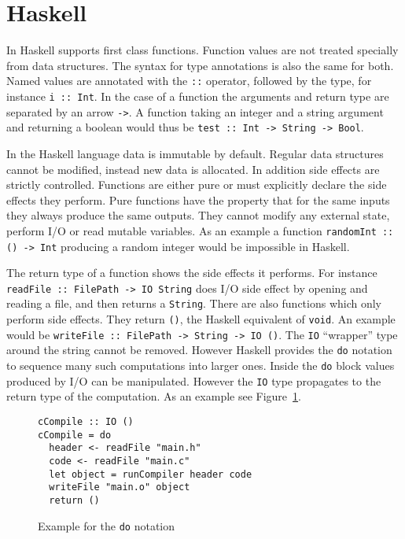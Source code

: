 \section{Haskell}

\label{sec:haskell}

In Haskell supports first class functions. Function values are not treated
specially from data structures. The syntax for type annotations is also the same
for both. Named values are annotated with the \texttt{::} operator, followed by
the type, for instance \texttt{i :: Int}. In the case of a function the
arguments and return type are separated by an arrow \texttt{->}. A function
taking an integer and a string argument and returning a boolean would thus be
\texttt{test :: Int -> String -> Bool}.

In the Haskell language data is immutable by default. Regular data structures
cannot be modified, instead new data is allocated. In addition side effects are
strictly controlled. Functions are either pure or must explicitly declare the
side effects they perform. Pure functions have the property that for the same
inputs they always produce the same outputs. They cannot modify any external
state, perform I/O or read mutable variables. As an example a function
\texttt{randomInt :: () -> Int} producing a random integer would be impossible
in Haskell.

The return type of a function shows the side effects it performs. For instance
\texttt{readFile :: FilePath -> IO String} does I/O side effect by opening and
reading a file, and then returns a \texttt{String}. There are also functions
which only perform side effects. They return \texttt{()}, the Haskell equivalent
of \texttt{void}. An example would be \texttt{writeFile :: FilePath -> String ->
  IO ()}. The \texttt{IO} ``wrapper'' type around the string cannot be removed.
However Haskell provides the \texttt{do} notation to sequence many such
computations into larger ones. Inside the \texttt{do} block values produced by
I/O can be manipulated. However the \texttt{IO} type propagates to the return
type of the computation. As an example see Figure~\ref{fig:simple-do}.


\begin{figure}
  \begin{lstlisting}
cCompile :: IO ()
cCompile = do
  header <- readFile "main.h"
  code <- readFile "main.c"
  let object = runCompiler header code
  writeFile "main.o" object
  return ()
  \end{lstlisting}
  \caption{Example for the \texttt{do} notation}
  \label{fig:simple-do}
\end{figure}


